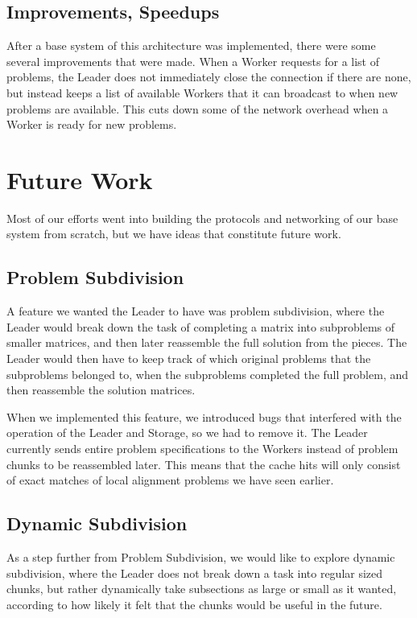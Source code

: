 \documentclass[11pt]{article}
\begin{document}
\subsection{Improvements, Speedups}
After a base system of this architecture was implemented, there were some several improvements that were made. When a Worker requests for a list of problems, the Leader does not immediately close the connection if there are none, but instead keeps a list of available Workers that it can broadcast to when new problems are available. This cuts down some of the network overhead when a Worker is ready for new problems. %


\section{Future Work}
Most of our efforts went into building the protocols and networking of our base system from scratch, but we have ideas that constitute future work.

\subsection{Problem Subdivision}
A feature we wanted the Leader to have was problem subdivision, where the Leader would break down the task of completing a matrix into subproblems of smaller matrices, and then later reassemble the full solution from the pieces. The Leader would then have to keep track of which original problems that the subproblems belonged to, when the subproblems completed the full problem, and then reassemble the solution matrices.
  
When we implemented this feature, we introduced bugs that interfered with the operation of the Leader and Storage, so we had to remove it. The Leader currently sends entire problem specifications to the Workers instead of problem chunks to be reassembled later. This means that the cache hits will only consist of exact matches of local alignment problems we have seen earlier. 

\subsection{Dynamic Subdivision}
As a step further from Problem Subdivision, we would like to explore dynamic subdivision, where the Leader does not break down a task into regular sized chunks, but rather dynamically take subsections as large or small as it wanted, according to how likely it felt that the chunks would be useful in the future.
\end{document}
